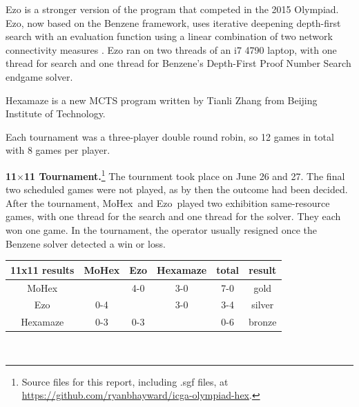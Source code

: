 \documentclass{icga}
\newif\iflong\longfalse  %
\def\Eo{\mbox{\sc Ezo}}
\def\Hz{\mbox{\sc Hexamaze}}
\def\Mx{\mbox{\sc MoHex}}
\begin{document}
\Eo{} is a stronger version of the program that competed in the 2015 Olympiad.
\Eo{}, now based on the Benzene framework, 
uses iterative deepening depth-first search 
with an evaluation function using a linear combination of
two network connectivity measures .
\Eo{} ran on two threads of an i7 4790 laptop,
with one thread for search and one thread for
Benzene's Depth-First Proof Number Search endgame solver.

\Hz{} is a new MCTS program written by Tianli Zhang from 
Beijing Institute of Technology.

Each tournament was a three-player double round robin, so 12 games
in total with 8 games per player.

{\large\bf 11$\times$11 Tournament.}\footnote{Source files for this report, including .sgf files, at \url{https://github.com/ryanbhayward/icga-olympiad-hex}.}
The tournment took place on June 26 and 27.
The final two scheduled games were not played,
as by then the outcome had been decided.
After the tournament, \Mx\ and \Eo\ played two 
exhibition same-resource games,
with one thread for the search and one
thread for the solver. They each won one game.
In the tournament, the operator usually resigned
once the Benzene solver detected a win or loss.

\hfill\begin{tabular}{|c|c|c|c|c|c|}
\hline 11x11 results &\Mx{} &\Eo{}  & \Hz{}  & total & result \\ 
\hline \Mx{}         &      &  4-0  &  3-0   & 7-0  &  gold \\
\hline \Eo{}         &  0-4 &       &  3-0   & 3-4  &  silver \\
\hline \Hz{}         &  0-3 &  0-3  &        & 0-6  &  bronze \\
\hline
\end{tabular}\hfill~

\iflong
This is the longer version, so we include all games.
\fi
\end{document}
